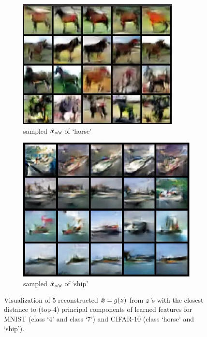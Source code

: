 \documentclass[../../book-main.tex]{subfiles}
\begin{document}
\begin{figure}[t]
    \hfill
    \begin{subfigure}[t]{0.20\textwidth}
        \centering
        \includegraphics[width=\textwidth]{chapters/chapter5/figs/horse_z.jpg}
        \caption{sampled $\hat{\bm{x}}_{old}$ of `horse'}
    \end{subfigure}
    \hfill
    \begin{subfigure}[t]{0.20\textwidth}
        \centering
        \includegraphics[width=\textwidth]{chapters/chapter5/figs/ship_z.jpg}
        \caption{sampled $\hat{\bm{x}}_{old}$ of `ship'}
    \end{subfigure}
    \caption{\small Visualization of 5 reconstructed $\hat {\bm{x}}=g(\bm{z})$ from $\bm{z}$'s with the closest distance to (top-4) principal components of learned features for {MNIST} (class ‘4’ and class ‘7’) and {CIFAR-10} (class ‘horse’ and  ‘ship’).}
    \label{fig:pca_sampling_main}
\end{figure}
\end{document}

